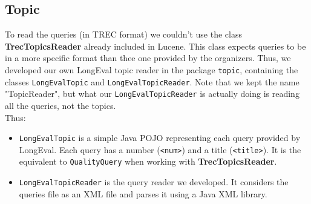 \subsection{Topic}\label{subsec:topic}
To read the queries (in TREC format) we couldn't use the class \textbf{TrecTopicsReader} already included in Lucene.
This class expects queries to be in a more specific format than thee one provided by the organizers.
Thus, we developed our own LongEval topic reader in the package \texttt{topic}, containing the classes
\texttt{LongEvalTopic} and \texttt{LongEvalTopicReader}.
Note that we kept the name "TopicReader", but what our \texttt{LongEvalTopicReader} is actually doing is reading
all the queries, not the topics. \\
Thus:
\begin{itemize}
    \item \texttt{LongEvalTopic} is a simple Java POJO representing each query provided by LongEval.
    Each query has a number (\texttt{<num>}) and a title (\texttt{<title>}).
    It is the equivalent to \texttt{QualityQuery} when working with \textbf{TrecTopicsReader}.
    \item \texttt{LongEvalTopicReader} is the query reader we developed.
    It considers the queries file as an XML file and parses it using a Java XML library.
\end{itemize}

